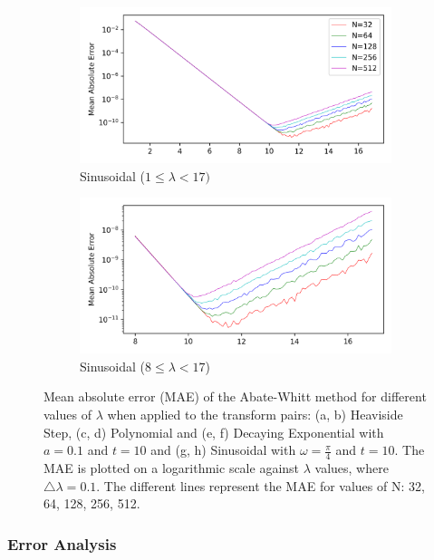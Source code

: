 \documentclass[a4paper]{report}
\begin{document}
\begin{figure}[H]
    \begin{subfigure}{.45\linewidth}
      \includegraphics[width=\linewidth]{images/abate_whitt/sinusoidal.png}
      \caption{Sinusoidal ($1 \leq \lambda < 17)$}
    \end{subfigure}\hfill
    \begin{subfigure}{.45\linewidth}
      \includegraphics[width=\linewidth]{images/abate_whitt/sinusoidal_zoomed.png}
      \caption{Sinusoidal ($8 \leq \lambda < 17$)}
    \end{subfigure}
    
    \caption{Mean absolute error (MAE) of the Abate-Whitt method for different values of $\lambda$ when applied to the transform pairs: (a, b) Heaviside Step, (c, d) Polynomial and (e, f) Decaying Exponential with $a = 0.1$ and $t = 10$ and (g, h) Sinusoidal with $\omega = \frac{\pi}{4}$ and $t = 10$. The MAE is plotted on a logarithmic scale against $\lambda$ values, where $\triangle \lambda = 0.1$. The different lines represent the MAE for values of N: 32, 64, 128, 256, 512.}
    \label{fig:MAE_Abate_Whitt}
\end{figure}

\subsubsection{Error Analysis}
\end{document}
